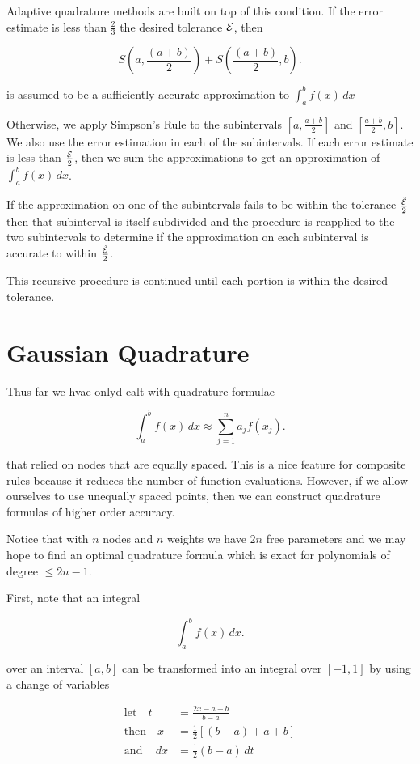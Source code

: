Adaptive quadrature methods are built on top of this condition. If the error
estimate is less than $\frac{2}{3}$ the desired tolerance $\mathcal{E}$, then 

\[
S(a, \frac{(a+b)}{2}) + S(\frac{(a+b)}{2}, b)
.\]

is assumed to be a sufficiently accurate approximation to $\int_{a}^{b} f(x) \, dx$ 

Otherwise, we apply Simpson's Rule to the subintervals $[a, \frac{a+b}{2}]$ and
$[\frac{a+b}{2}, b]$. We also use the error estimation in each of the
subintervals. If each error estimate is less than $\frac{\mathcal{E}}{2}$, then we
sum the approximations to get an approximation of $\int_{a}^{b} f(x) \, dx$.

If the approximation on one of the subintervals fails to be within the tolerance
$\frac{\tilde {\mathcal{E}}}{2}$ then that subinterval is itself subdivided and the
procedure is reapplied to the two subintervals to determine if the approximation
on each subinterval is accurate to within $\frac{\tilde {\mathcal{E}}}{2}$.

This recursive procedure is continued until each portion is within the desired
tolerance.

\section{Gaussian Quadrature}

Thus far we hvae onlyd ealt with quadrature formulae

\[
\int_{a}^{b} f(x) \, dx \approx \sum_{j=1}^{n} a_j f(x_j)
.\]

that relied on nodes that are equally spaced. This is a nice feature for
composite rules because it reduces the number of function evaluations. However,
if we allow ourselves to use unequally spaced points, then we can construct
quadrature formulas of higher order accuracy.

Notice that with $n$ nodes and $n$ weights we have $2n$ free parameters and we
may hope to find an optimal quadrature formula which is exact for polynomials of
degree $\leq 2n-1$.

First, note that an integral

\[
\int_{a}^{b} f(x) \, dx
.\]

over an interval $[a,b]$ can be transformed into an integral over $[-1, 1]$ by
using a change of variables

\begin{align*}
\text{let}\quad t &= \frac{2x-a-b}{b-a} \\
\text{then}\quad  x &= \frac{1}{2}[(b-a) + a + b] \\
\text{and} \quad \,dx &= \frac{1}{2}(b-a) \,dt
\end{align*}

